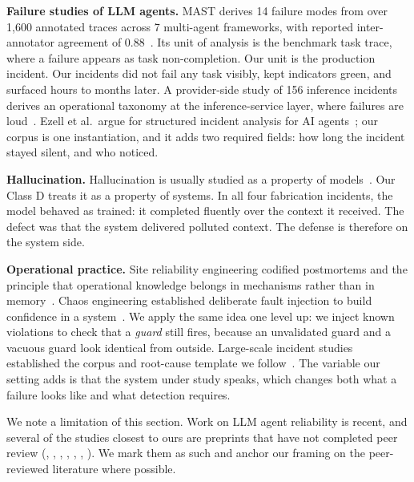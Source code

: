 \documentclass[conference]{IEEEtran}
\begin{document}
\textbf{Failure studies of LLM agents.} MAST derives 14 failure modes from
over 1{,}600 annotated traces across 7 multi-agent frameworks, with reported
inter-annotator agreement of 0.88~\cite{cemri2025mast}. Its unit of analysis
is the benchmark task trace, where a failure appears as task
non-completion. Our unit is the production incident. Our incidents did not
fail any task visibly, kept indicators green, and surfaced hours to months
later. A provider-side study of 156 inference incidents derives an
operational taxonomy at the inference-service layer, where failures are
loud~\cite{ranganathan2025inference}. Ezell et al.\ argue for structured
incident analysis for AI agents~\cite{ezell2025incident}; our corpus is one
instantiation, and it adds two required fields: how long the incident stayed
silent, and who noticed.

\textbf{Hallucination.} Hallucination is usually studied as a property of
models~\cite{huang2023hallucination}. Our Class D treats it as a property of
systems. In all four fabrication incidents, the model behaved as trained: it
completed fluently over the context it received. The defect was that the
system delivered polluted context. The defense is therefore on the system
side.

\textbf{Operational practice.} Site reliability engineering codified
postmortems and the principle that operational knowledge belongs in
mechanisms rather than in memory~\cite{beyer2016sre}. Chaos engineering
established deliberate fault injection to build confidence in a
system~\cite{basiri2016chaos}. We apply the same idea one level up: we
inject known violations to check that a \emph{guard} still fires, because an
unvalidated guard and a vacuous guard look identical from outside.
Large-scale incident studies established the corpus and root-cause template
we follow~\cite{ghosh2022incidents}. The variable our setting adds is that
the system under study speaks, which changes both what a failure looks like
and what detection requires.

We note a limitation of this section. Work on LLM agent reliability is
recent, and several of the studies closest to ours are preprints that have
not completed peer review (\cite{cemri2025mast},
\cite{ranganathan2025inference}, \cite{zhou2025shielda}, \cite{xiao2026air},
\cite{taraghi2026mcp}, \cite{ezell2025incident},
\cite{owotogbe2026mcpfaults}). We mark them as such and anchor our framing
on the peer-reviewed literature where possible.

\end{document}
